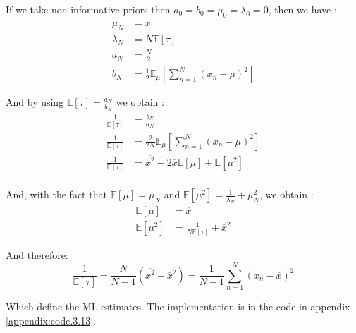 \documentclass{article}
\begin{document}
If we take non-informative priors then $a_0 = b_0 = \mu_0 = \lambda_0 = 0$, then we have :
\begin{equation}
    \begin{split}
        \mu_N     & = \overline{x}                                                      \\
        \lambda_N & = N\mathbb{E}[\tau]                                                 \\
        a_N       & = \frac{N}{2}                                                       \\
        b_N       & = \frac{1}{2}\mathbb{E}_\mu\left[\sum_{n=1}^{N}(x_n - \mu)^2\right]
    \end{split}
\end{equation}

And by using $\mathbb{E}[\tau] = \frac{a_N}{b_N}$ we obtain :
\begin{equation}
    \begin{split}
        \frac{1}{\mathbb{E}[\tau]} & = \frac{b_N}{a_N}                                                    \\
        \frac{1}{\mathbb{E}[\tau]} & = \frac{2}{2N}\mathbb{E}_\mu\left[\sum_{n=1}^{N}(x_n - \mu)^2\right] \\
        \frac{1}{\mathbb{E}[\tau]} & = \overline{x^2} - 2\overline{x}\mathbb{E}[\mu] + \mathbb{E}[\mu^2]  \\
    \end{split}
\end{equation}

And, with the fact that $\mathbb{E}[\mu] = \mu_N$ and $\mathbb{E}[\mu^2] = \frac{1}{\lambda_N} + \mu_N^2$, we obtain :
\begin{equation}
    \begin{split}
        \mathbb{E}[\mu]   & = \overline{x}                                 \\
        \mathbb{E}[\mu^2] & = \frac{1}{N\mathbb{E}[\tau]} + \overline{x}^2
    \end{split}
\end{equation}

And therefore:
\begin{equation}
    \frac{1}{\mathbb{E}[\tau]} = \frac{N}{N-1}(\overline{x^2} - \overline{x}^2) = \frac{1}{N-1}\sum_{n=1}^{N}(x_n - \overline{x})^2
\end{equation}

Which define the ML estimates. The implementation is in the code in appendix \ref{appendix:code.3.13}.
\end{document}
